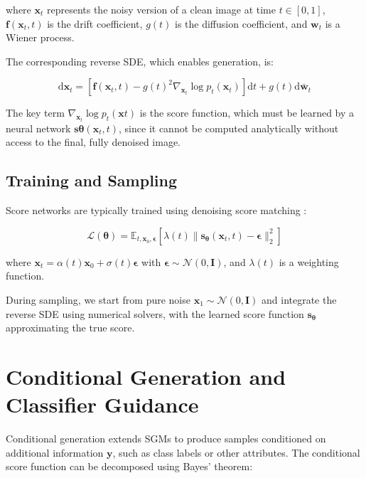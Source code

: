 \documentclass[licencjacka,en]{pracamgr}
\newcommand{\diff}{\mathrm{d}}
\begin{document}
where $\mathbf{x}_t$ represents the noisy version of a clean image at time $t \in [0, 1]$, $\mathbf{f}(\mathbf{x}_t, t)$ is the drift coefficient, $g(t)$ is the diffusion coefficient, and $\mathbf{w}_t$ is a Wiener process.

The corresponding reverse SDE, which enables generation, is:

\begin{equation}
\diff \mathbf{x}_t = [\mathbf{f}(\mathbf{x}_t, t) - g(t)^2 \nabla_{\mathbf{x}_t} \log p_t(\mathbf{x}_t)] \diff t + g(t) \diff \bar{\mathbf{w}}_t
\label{eq:reverse_sde}
\end{equation}

The key term $\nabla_{\mathbf{x}_t} \log p_t(\mathbf{x}t)$ is the score function, which must be learned by a neural network $\mathbf{s}{\boldsymbol{\theta}}(\mathbf{x}_t, t)$, since it cannot be computed analytically without access to the final, fully denoised image.

\subsection{Training and Sampling}

Score networks are typically trained using denoising score matching \cite{6795935, song2020generativemodelingestimatinggradients}:

\begin{equation}
\mathcal{L}(\boldsymbol{\theta}) = \mathbb{E}_{t, \mathbf{x}_0, \boldsymbol{\epsilon}} \left[ \lambda(t) \|\mathbf{s}_{\boldsymbol{\theta}}(\mathbf{x}_t, t) - \boldsymbol{\epsilon}\|_2^2 \right]
\label{eq:score_matching_loss}
\end{equation}

where $\mathbf{x}_t = \alpha(t)\mathbf{x}_0 + \sigma(t)\boldsymbol{\epsilon}$ with $\boldsymbol{\epsilon} \sim \mathcal{N}(0, \mathbf{I})$, and $\lambda(t)$ is a weighting function.

During sampling, we start from pure noise $\mathbf{x}_1 \sim \mathcal{N}(0, \mathbf{I})$ and integrate the reverse SDE using numerical solvers, with the learned score function $\mathbf{s}_{\boldsymbol{\theta}}$ approximating the true score.

\section{Conditional Generation and Classifier Guidance}

Conditional generation extends SGMs to produce samples conditioned on additional information $\mathbf{y}$, such as class labels or other attributes. The conditional score function can be decomposed using Bayes' theorem:
\end{document}
